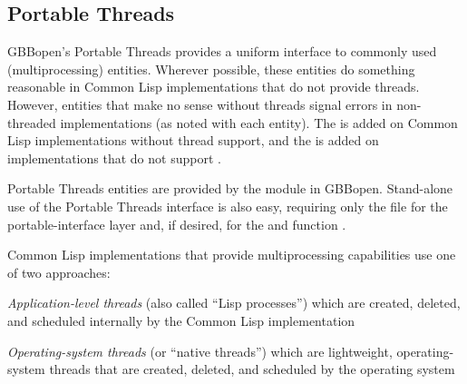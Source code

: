 \documentclass[10pt,twoside,english,pdftex]{article}
\begin{document}

\T\markright{}%
\T\pagestyle{plain}
\T\clearpage
\W{}
\T\pagestyle{fancy}
\T\thispagestyle{fancybottom}
\T\global\def\fnlastname{ }%

\subsection{Portable Threads}
\label{sec:portablethreads}%

%
%
GBBopen's Portable Threads provides a uniform interface to commonly used
 (multiprocessing) entities.  Wherever possible, these entities
do something reasonable in Common Lisp implementations that do not provide
threads. However, entities that make no sense without threads signal errors in
non-threaded implementations (as noted with each entity).  The 
 is added on Common Lisp implementations
without thread support, and the 
 is added on implementations that do
not support .

Portable Threads entities are provided by the 
module in GBBopen.  Stand-alone use of the Portable Threads interface is also
easy, requiring only the
file for the portable-interface layer and, if desired,
for the  and  function
.


Common Lisp implementations that provide multiprocessing capabilities use one
of two approaches:
\begin{tightitemize}
\item \textit{Application-level threads\/} (also called ``Lisp processes'')
  which are created, deleted, and scheduled internally by the Common Lisp
  implementation
\item \textit{Operating-system threads\/} (or ``native threads'') which are
  lightweight, operating-system threads that are created, deleted, and
  scheduled by the operating system
\end{tightitemize}
\end{document}
